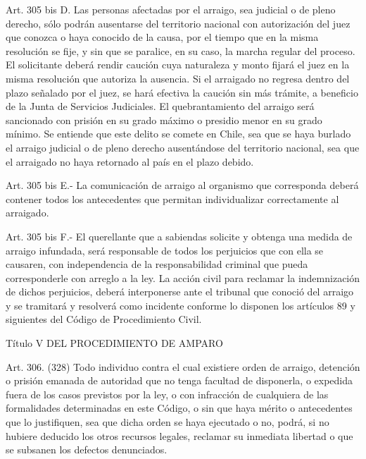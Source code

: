     Art. 305 bis D. Las personas afectadas por el arraigo, sea judicial o de pleno derecho, sólo podrán ausentarse del territorio nacional con autorización del juez que conozca o haya conocido de la causa, por el tiempo que en la misma resolución se fije, y sin que se paralice, en su caso, la marcha regular del proceso.
    El solicitante deberá rendir caución cuya naturaleza y monto fijará el juez en la misma resolución que autoriza la ausencia.
    Si el arraigado no regresa dentro del plazo señalado por el juez, se hará efectiva la caución sin más trámite, a beneficio de la Junta de Servicios Judiciales.
    El quebrantamiento del arraigo será sancionado con prisión en su grado máximo o presidio menor en su grado mínimo. Se entiende que este delito se comete en Chile, sea que se haya burlado el arraigo judicial o de pleno derecho ausentándose del territorio nacional, sea que el arraigado no haya retornado al país en el plazo debido.

    Art. 305 bis E.- La comunicación de arraigo al organismo que corresponda deberá contener todos los antecedentes que permitan individualizar correctamente al arraigado.

    Art. 305 bis F.- El querellante que a sabiendas solicite y obtenga una medida de arraigo infundada, será responsable de todos los perjuicios que con ella se causaren, con independencia de la responsabilidad criminal que pueda corresponderle con arreglo a la ley.
La acción civil para reclamar la indemnización de dichos perjuicios, deberá interponerse ante el tribunal que conoció del arraigo y se tramitará y resolverá como incidente conforme lo disponen los artículos 89 y siguientes del Código de Procedimiento Civil.

    Título V
    DEL PROCEDIMIENTO DE AMPARO


    Art. 306. (328) Todo individuo contra el cual existiere orden de arraigo, detención o prisión emanada de autoridad que no tenga facultad de disponerla, o expedida fuera de los casos previstos por la ley, o con infracción de cualquiera de las formalidades determinadas en este Código, o sin que haya mérito o antecedentes que lo justifiquen, sea que dicha orden se haya ejecutado o no, podrá, si no hubiere deducido los otros recursos legales, reclamar su inmediata libertad o que se subsanen los defectos denunciados.

